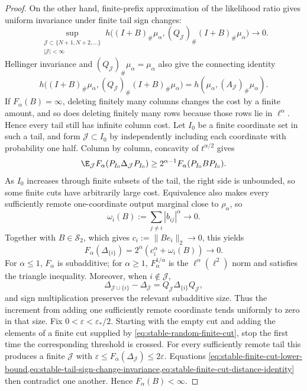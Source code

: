 \begin{proof}
On the other hand, finite-prefix approximation of the likelihood ratio
gives uniform invariance under finite tail sign changes:
\begin{equation}
 \sup_{\substack{\mathcal J\subset\{N+1,N+2,\ldots\}\\ |\mathcal J|<\infty}}
 h\bigl((I+B)_\#\mu_\alpha,
        (Q_{\mathcal J})_\#(I+B)_\#\mu_\alpha\bigr)
 \longrightarrow0.
 \label{eq:stable-tail-sign-change-invariance}
\end{equation}
Hellinger invariance and \((Q_{\mathcal J})_\#\mu_\alpha=\mu_\alpha\) also give the
connecting identity
\begin{equation}
 h\bigl((I+B)_\#\mu_\alpha,
        (Q_{\mathcal J})_\#(I+B)_\#\mu_\alpha\bigr)
 =h(\mu_\alpha,(A_{\mathcal J})_\#\mu_\alpha).
 \label{eq:stable-finite-cut-distance-identity}
\end{equation}
If \(F_\alpha(B)=\infty\), deleting finitely many columns changes the cost
by a finite amount, and so does deleting finitely many rows because those
rows lie in \(\ell^\alpha\).
Hence every tail still has infinite column cost.
Let \(I_0\) be a finite coordinate set in such a tail, and
form \(\mathcal J\subset I_0\) by independently including each
coordinate with probability
one half.
Column by column, concavity of \(t^{\alpha/2}\) gives
\begin{equation}
 \E_{\mathcal J}F_\alpha(P_{I_0}\Delta_{\mathcal J}P_{I_0})
 \ge2^{\alpha-1}F_\alpha(P_{I_0}BP_{I_0}).
 \label{eq:stable-random-finite-cut}
\end{equation}
As \(I_0\) increases through finite subsets of the tail, the right side is
unbounded, so some finite cuts have arbitrarily large cost.
Equivalence also makes every sufficiently remote one-coordinate output
marginal close to \(\rho_\alpha\), so
\[
 \omega_i(B):=\sum_{j\ne i}|b_{ij}|^\alpha\longrightarrow0.
\]
Together with \(B\in\mathcal S_2\), which gives
\(c_i:=\|Be_i\|_2\to0\), this yields
\[
 F_\alpha(\Delta_{\{i\}})
 =2^\alpha(c_i^\alpha+\omega_i(B))\longrightarrow0.
\]
For \(\alpha\le1\), \(F_\alpha\) is subadditive; for \(\alpha\ge1\),
\(F_\alpha^{1/\alpha}\) is the \(\ell^\alpha(\ell^2)\) norm and satisfies
the triangle inequality.
Moreover, when \(i\notin\mathcal J\),
\[
 \Delta_{\mathcal J\cup\{i\}}-\Delta_{\mathcal J}
 =Q_{\mathcal J}\Delta_{\{i\}}Q_{\mathcal J},
\]
and sign multiplication preserves the relevant subadditive size.
Thus the increment from adding one sufficiently remote coordinate tends
uniformly to zero in that size.
Fix \(0<\varepsilon<\varepsilon_*/2\).
Starting with the empty cut and adding the elements of a finite cut supplied
by \eqref{eq:stable-random-finite-cut}, stop the first time the corresponding
threshold is crossed.
For every sufficiently remote tail this produces a finite \(\mathcal J\) with
\(\varepsilon\le F_\alpha(\Delta_{\mathcal J})\le2\varepsilon\).
Equations
\cref{eq:stable-finite-cut-lower-bound,eq:stable-tail-sign-change-invariance,eq:stable-finite-cut-distance-identity} then contradict one another.
Hence \(F_\alpha(B)<\infty\).


\end{proof}
